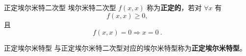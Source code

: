 \begin{definition}{正定埃尔米特二次型}
埃尔米特二次型 $f(   x,   x)$ 称为\textbf{正定的}，若对 $\forall    x$ 有
\begin{equation}
f(   x,   x)\geq0,
\end{equation}
且
\begin{equation}
f(   x,   x)=0\Rightarrow   x=   0~.
\end{equation}
\end{definition}
\begin{definition}{正定埃尔米特型}\label{HeFor_def1}
与正定埃尔米特二次型对应的埃尔米特型称为\textbf{正定埃尔米特型}。
\end{definition}